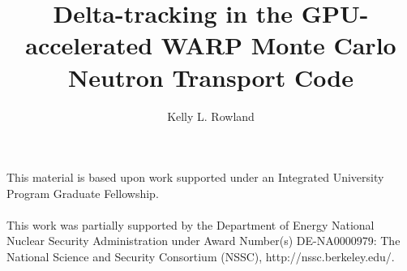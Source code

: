 \documentclass[masters]{ucbthesis}
\begin{document}

\title{Delta-tracking in the GPU-accelerated WARP Monte Carlo Neutron Transport Code}
\author{Kelly L. Rowland}



\maketitle
\approvalpage
\copyrightpage

\tableofcontents
\clearpage
\listoffigures
\clearpage
\listoftables

\begin{frontmatter}

\begin{acknowledgements}

\noindent This material is based upon work supported under an Integrated University Program Graduate 
Fellowship.
\\ \\
\noindent This work was partially supported by the Department of Energy National Nuclear Security 
Administration under Award Number(s) DE-NA0000979: The National Science and Security Consortium (NSSC), 
http://nssc.berkeley.edu/.

\end{acknowledgements}

\end{frontmatter}







\begin{appendix}

\end{appendix}

\printbibliography
\end{document}
